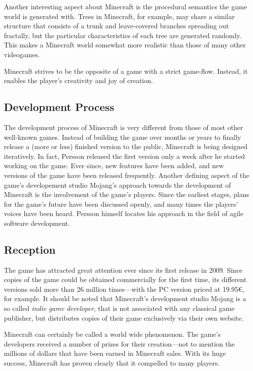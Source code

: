Another interesting aspect about Minecraft is the procedural semantics the game world is generated with. Trees in Minecraft, for example, may share a similar structure that consists of a trunk and leave-covered branches spreading out fractally, but the particular characteristics of each tree are generated randomly. This makes a Minecraft world somewhat more realistic than those of many other videogames.

Minecraft strives to be the opposite of a game with a strict game-flow. Instead, it enables the player's creativity and joy of creation.

        \subsection{Development Process}
The development process of Minecraft is very different from those of most other well-known games. Instead of building the game over months or years to finally release a (more or less) finished version to the public, Minecraft is being designed iteratively. In fact, Persson released the first version only a week after he started working on the game. Ever since, new features have been added, and new versions of the game have been released frequently. Another defining aspect of the game's developement studio Mojang's approach towards the development of Minecraft is the involvement of the game's players. Since the earliest stages, plans for the game's future have been discussed openly, and many times the players' voices have been heard. Persson himself locates his approach in the field of agile software development.~\cite{Duncan:2011:MBC:2207096.2207097}

        \subsection{Reception}
The game has attracted great attention ever since its first release in 2009. Since copies of the game could be obtained commercially for the first time, its different versions sold more than 26 million times---with the PC version priced at 19.95\euro, for example. It should be noted that Minecraft's development studio Mojang is a so called \emph{indie game developer}, that is not associated with any classical game publisher, but distributes copies of their game exclusively via their own website.

Minecraft can certainly be called a world wide phenomenon. The game's developers received a number of prizes for their creation---not to mention the millions of dollars that have been earned in Minecraft sales. With its huge success, Minecraft has proven clearly that it compelled to many players.

